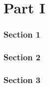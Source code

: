 \documentclass{article}
\begin{document}
\tableofcontents
\part{Part I}
\section{Section 1}
\section{Section 2}
\section{Section 3}
\end{document}
